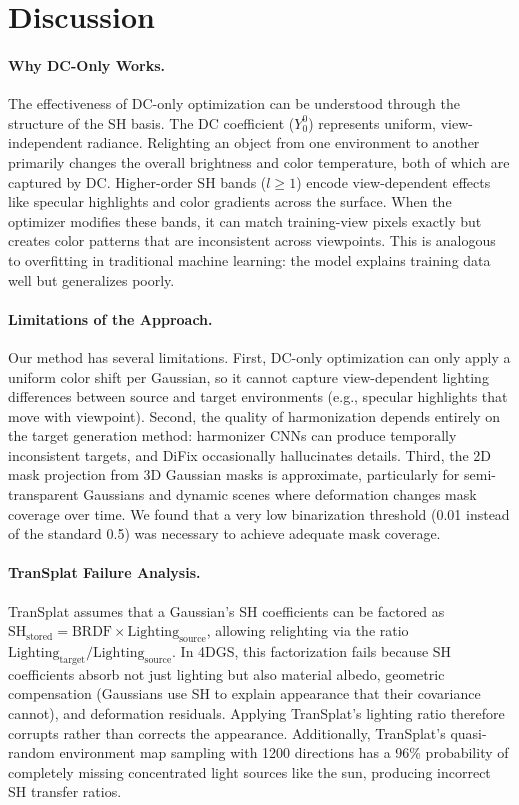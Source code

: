 \documentclass[10pt,twocolumn,letterpaper]{article}
\begin{document}
\section{Discussion}

\paragraph{Why DC-Only Works.}
The effectiveness of DC-only optimization can be understood through the structure of the SH basis. The DC coefficient ($Y_0^0$) represents uniform, view-independent radiance. Relighting an object from one environment to another primarily changes the overall brightness and color temperature, both of which are captured by DC. Higher-order SH bands ($l \geq 1$) encode view-dependent effects like specular highlights and color gradients across the surface. When the optimizer modifies these bands, it can match training-view pixels exactly but creates color patterns that are inconsistent across viewpoints. This is analogous to overfitting in traditional machine learning: the model explains training data well but generalizes poorly.

\paragraph{Limitations of the Approach.}
Our method has several limitations. First, DC-only optimization can only apply a uniform color shift per Gaussian, so it cannot capture view-dependent lighting differences between source and target environments (e.g., specular highlights that move with viewpoint). Second, the quality of harmonization depends entirely on the target generation method: harmonizer CNNs can produce temporally inconsistent targets, and DiFix occasionally hallucinates details. Third, the 2D mask projection from 3D Gaussian masks is approximate, particularly for semi-transparent Gaussians and dynamic scenes where deformation changes mask coverage over time. We found that a very low binarization threshold (0.01 instead of the standard 0.5) was necessary to achieve adequate mask coverage.

\paragraph{TranSplat Failure Analysis.}
TranSplat assumes that a Gaussian's SH coefficients can be factored as $\text{SH}_{\text{stored}} = \text{BRDF} \times \text{Lighting}_{\text{source}}$, allowing relighting via the ratio $\text{Lighting}_{\text{target}} / \text{Lighting}_{\text{source}}$. In 4DGS, this factorization fails because SH coefficients absorb not just lighting but also material albedo, geometric compensation (Gaussians use SH to explain appearance that their covariance cannot), and deformation residuals. Applying TranSplat's lighting ratio therefore corrupts rather than corrects the appearance. Additionally, TranSplat's quasi-random environment map sampling with 1200 directions has a 96\% probability of completely missing concentrated light sources like the sun, producing incorrect SH transfer ratios.
\end{document}
